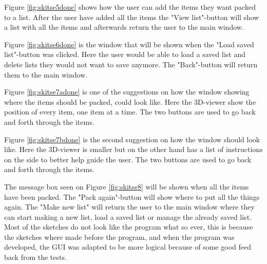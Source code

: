 Figure \ref{fig:skitse5done} shows how the user can add the items they want packed to a list. After the user have added all the items the "View list"-button will show a list with all the items and afterwards return the user to the main window.


Figure \ref{fig:skitse6done} is the window that will be shown when the "Load saved list"-button was clicked. Here the user would be able to load a saved list and delete lists they would not want to save anymore. The "Back"-button will return them to the main window.


Figure \ref{fig:skitse7adone} is one of the suggestions on how the window showing where the items should be packed, could look like. Here the 3D-viewer show the position of every item, one item at a time. The two buttons are used to go back and forth through the items.


Figure \ref{fig:skitse7bdone} is the second suggestion on how the window should look like. Here the 3D-viewer is smaller but on the other hand has a list of instructions on the side to better help guide the user. The two buttons are used to go back and forth through the items.


The message box seen on Figure \ref{fig:skitse8} will be shown when all the items have been packed. The "Pack again"-button will show where to put all the things again. The "Make new list" will return the user to the main window where they can start making a new list, load a saved list or manage the already saved list. Most of the sketches do not look like the program what so ever, this is because the sketches where made before the program, and when the program was developed, the GUI was adapted to be more logical because of some good feed back from the tests.
